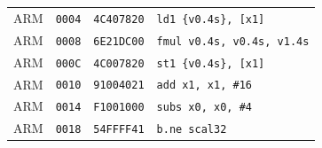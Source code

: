\begin{table}[htbp]
\begin{tabular}{@{}l|l|l|p{7.2cm}@{}}
ARM & \texttt{0004} & \texttt{4C407820} & \texttt{ld1 \{v0.4s\}, [x1]} \\
ARM & \texttt{0008} & \texttt{6E21DC00} & \texttt{fmul v0.4s, v0.4s, v1.4s} \\
ARM & \texttt{000C} & \texttt{4C007820} & \texttt{st1 \{v0.4s\}, [x1]} \\
ARM & \texttt{0010} & \texttt{91004021} & \texttt{add x1, x1, \#16} \\
ARM & \texttt{0014} & \texttt{F1001000} & \texttt{subs x0, x0, \#4} \\
ARM & \texttt{0018} & \texttt{54FFFF41} & \texttt{b.ne scal32} \\
\bottomrule
\end{tabular}
\endgroup
\end{table}
\noindent{}\par
